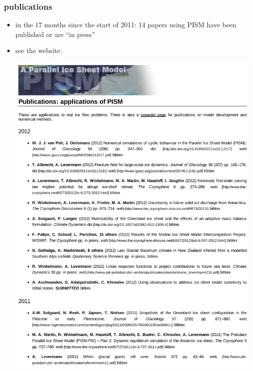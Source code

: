 \documentclass[hide notes,intlimits]{beamer}
\begin{document}
\begin{frame}
  \frametitle{publications}

  \begin{itemize}
  \item in the 17 months since the start of 2011: \alert{14 papers} using PISM have been published or are ``in press''
  \item see the website:
    \begin{center}
    \includegraphics[height=0.65\textheight]{publications}
    \end{center}
  \end{itemize}
\end{frame}
\end{document}
